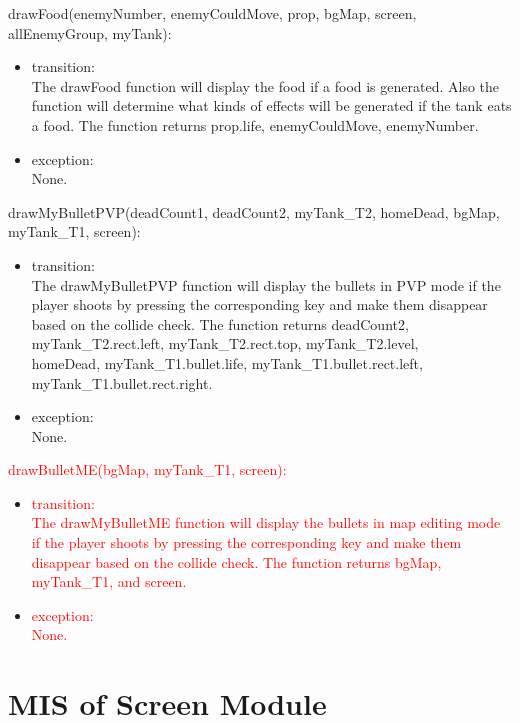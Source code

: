 \documentclass[12pt, titlepage]{article}
\begin{document}
	    drawFood(enemyNumber, enemyCouldMove, prop, bgMap, screen, allEnemyGroup, myTank):
	    \begin{itemize}
	    \item transition:\\
	    The drawFood function will display the food if a food is generated. Also the function will determine what kinds of effects will be generated if the tank eats a food. The function returns prop.life, enemyCouldMove, enemyNumber. \\
	    
	    \item exception:\\ None.
	    \end{itemize}
	    
	    drawMyBulletPVP(deadCount1, deadCount2, myTank\_T2, homeDead, bgMap, myTank\_T1, screen):
	    \begin{itemize}
	    \item transition:\\
	    The drawMyBulletPVP function will display the bullets in PVP mode if the player shoots by pressing the corresponding key and make them disappear based on the collide check. The function returns deadCount2, myTank\_T2.rect.left, myTank\_T2.rect.top, myTank\_T2.level, \\homeDead, myTank\_T1.bullet.life, myTank\_T1.bullet.rect.left, myTank\_T1.bullet.rect.right. \\
	    
	    \item exception:\\ None.
	    \end{itemize}
	   
	    \textcolor{red}{drawBulletME(bgMap, myTank\_T1, screen):}
	    \begin{itemize}
	    \item \textcolor{red}{transition:}\\
	    \textcolor{red}{The drawMyBulletME function will display the bullets in map editing mode if the player shoots by pressing the corresponding key and make them disappear based on the collide check. The function returns bgMap, myTank\_T1, and screen. }\\
	    
	    \item \textcolor{red}{exception:\\ None.}
	    \end{itemize}
	    
	    
\section{MIS of Screen Module}
\end{document}
